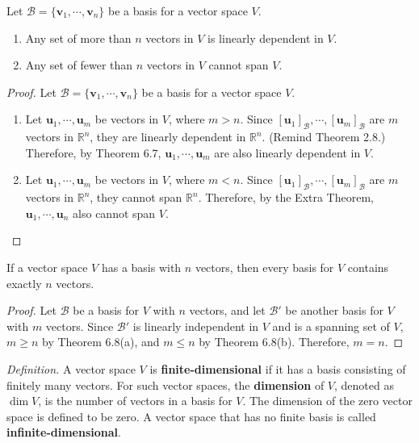 \begin{theorem}
	Let $\mathcal{B} = \{ \textbf{v}_1, \cdots, \textbf{v}_n \}$ be a basis for a vector space $V$. \begin{enumerate}
		\item Any set of more than $n$ vectors in $V$ is linearly dependent in $V$.
		\item Any set of fewer than $n$ vectors in $V$ cannot span $V$.
	\end{enumerate}
\end{theorem}

\begin{proof}
	Let $\mathcal{B} = \{ \textbf{v}_1, \cdots, \textbf{v}_n \}$ be a basis for a vector space $V$.
	\begin{enumerate}
		\item Let $\textbf{u}_1, \cdots, \textbf{u}_m$ be vectors in $V$, where $m > n$. Since $[\textbf{u}_1]_\mathcal{B}, \cdots, [\textbf{u}_m]_\mathcal{B}$ are $m$ vectors in $\mathbb{R}^n$, they are linearly dependent in $\mathbb{R}^n$. (Remind Theorem 2.8.) Therefore, by Theorem 6.7, $\textbf{u}_1, \cdots, \textbf{u}_m$ are also linearly dependent in $V$.
		\item Let $\textbf{u}_1, \cdots, \textbf{u}_m$ be vectors in $V$, where $m < n$. Since $[\textbf{u}_1]_\mathcal{B}, \cdots, [\textbf{u}_m]_\mathcal{B}$ are $m$ vectors in $\mathbb{R}^n$, they cannot span $\mathbb{R}^n$. Therefore, by the Extra Theorem, $\textbf{u}_1, \cdots, \textbf{u}_n$ also cannot span $V$.
	\end{enumerate}
\end{proof}

\begin{theorem}
	If a vector space $V$ has a basis with $n$ vectors, then every basis for $V$ contains exactly $n$ vectors.
\end{theorem}

\begin{proof}
	Let $\mathcal{B}$ be a basis for $V$ with $n$ vectors, and let $\mathcal{B}'$ be another basis for $V$ with $m$ vectors. Since $\mathcal{B}'$ is linearly independent in $V$ and is a spanning set of $V$, $m \ge n$ by Theorem 6.8(a), and $m \le n$ by Theorem 6.8(b). Therefore, $m = n$.
\end{proof}

\textit{Definition.} A vector space $V$ is \textbf{finite-dimensional} if it has a basis consisting of finitely many vectors. For such vector spaces, the \textbf{dimension} of $V$, denoted as $\dim{V}$, is the number of vectors in a basis for $V$.
The dimension of the zero vector space is defined to be zero. 
A vector space that has no finite basis is called \textbf{infinite-dimensional}.

